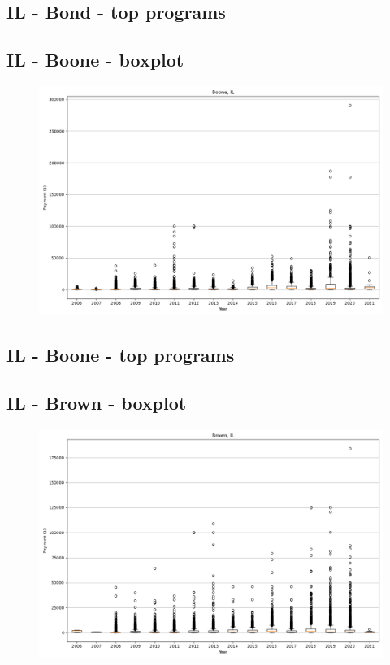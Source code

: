 \subsection*{IL - Bond - top programs}

\newpage
\subsection*{IL - Boone - boxplot}
\begin{figure}[h]
\centering
\includegraphics[width=7in]{../output/boxplots/counties/Boone-IL_boxplot.png}
\end{figure}


\subsection*{IL - Boone - top programs}

\newpage
\subsection*{IL - Brown - boxplot}
\begin{figure}[h]
\centering
\includegraphics[width=7in]{../output/boxplots/counties/Brown-IL_boxplot.png}
\end{figure}


